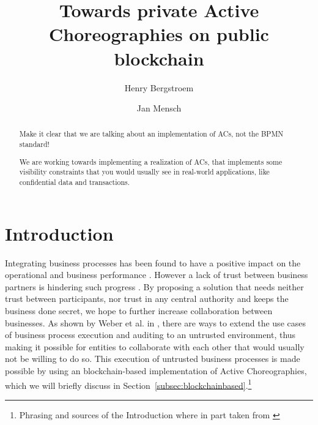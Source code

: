 \documentclass[runningheads]{llncs}
\newcommand{\refsec}[1]{Section~\ref{#1}}
\begin{document}
%
\title{Towards private Active Choreographies on public blockchain}
%
%
\author{Henry Bergstroem \and
Jan Mensch}
%
%


%
\maketitle              %
%
\begin{abstract}

    Make it clear that we are talking about an implementation of ACs, not the BPMN standard!
    
    
    We are working towards implementing a realization of ACs, that implements some visibility constraints that you would usually see in real-world applications, like confidential data and transactions.

\end{abstract}

\section{Introduction} \label{sec:intro}

Integrating business processes has been found to have a positive impact on the operational and business performance \cite{flynn2010impact,narayanan2011antecedents}. However a lack of trust between business partners is hindering such progress \cite{panayides2009impact}. By proposing a solution that needs neither trust between participants, nor trust in any central authority and keeps the business done secret, we hope to further increase collaboration between businesses. As shown by Weber et al. in \cite{weber2016untrusted}, there are ways to extend the use cases of business process execution and auditing to an untrusted environment, thus making it possible for entities to collaborate with each other that would usually not be willing to do so. This execution of untrusted business processes is made possible by using an blockchain-based implementation  of Active Choreographies, which we will briefly discuss in \refsec{subsec:blockchainbased}.\footnote{Phrasing and sources of the Introduction where in part taken from \cite{weber2016untrusted}} 
\end{document}

